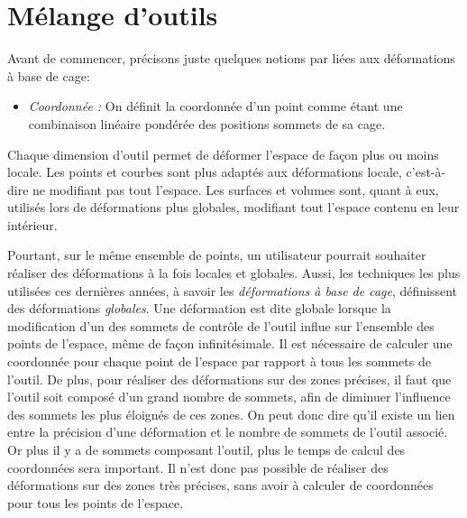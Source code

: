 
\chapter{Mélange d'outils}

\graphicspath{ {Chapter2/Chapter2Figs/PNG/}
  {Chapter2/Chapter2Figs/PDF/} {Chapter2/Chapter2Figs/} }

Avant de commencer, précisons juste quelques notions par liées aux
déformations à base de cage:
\begin{itemize}
\item{\textit{Coordonnée :}} On définit la coordonnée d'un point comme
  étant une combinaison linéaire pondérée des positions sommets de sa
  cage.\\
\end{itemize}

Chaque dimension d'outil permet de déformer l'espace de façon plus ou
moins locale. Les points et courbes sont plus adaptés aux déformations
locale, c'est-à-dire ne modifiant pas tout l'espace. Les surfaces et
volumes sont, quant à eux, utilisés lors de déformations plus
globales, modifiant tout l'espace contenu en leur intérieur.

Pourtant, sur le même ensemble de points, un utilisateur pourrait
souhaiter réaliser des déformations à la fois locales et
globales. Aussi, les techniques les plus utilisées ces dernières
années, à savoir les \textit{déformations à base de cage}, définissent
des déformations \textit{globales}. Une déformation est dite globale
lorsque la modification d'un des sommets de contrôle de l'outil influe
sur l'ensemble des points de l'espace, même de façon
infinitésimale. Il est nécessaire de calculer une coordonnée pour
chaque point de l'espace par rapport à tous les sommets de l'outil. De
plus, pour réaliser des déformations sur des zones précises, il faut
que l'outil soit composé d'un grand nombre de sommets, afin de
diminuer l'influence des sommets les plus éloignés de ces zones. On
peut donc dire qu'il existe un lien entre la précision d'une
déformation et le nombre de sommets de l'outil associé. Or plus il y a
de sommets composant l'outil, plus le temps de calcul des coordonnées
sera important. Il n'est donc pas possible de réaliser des
déformations sur des zones très précises, sans avoir à calculer de
coordonnées pour tous les points de l'espace.

